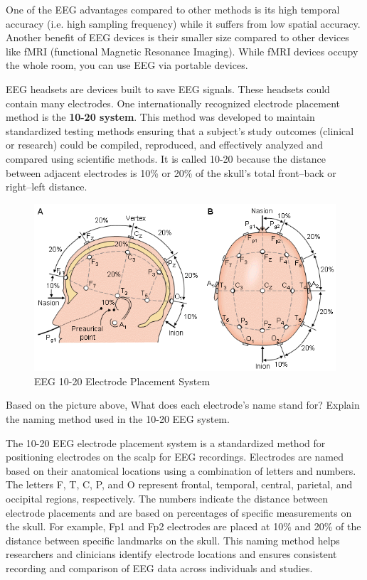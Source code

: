 \documentclass[12pt]{article}
\begin{document}
One of the EEG advantages compared to other methods is its high temporal accuracy (i.e. high sampling frequency) while it suffers from low spatial accuracy. Another benefit of EEG devices is their smaller size compared to other devices like fMRI (functional Magnetic Resonance Imaging). While fMRI devices occupy the whole room, you can use EEG via portable devices.\par

EEG headsets are devices built to save EEG signals. These headsets could contain many electrodes. One internationally recognized electrode placement method is the \textbf{10-20 system}. This method was developed to maintain standardized testing methods ensuring that a subject's study outcomes (clinical or research) could be compiled, reproduced, and effectively analyzed and compared using scientific methods. It is called 10-20 because the distance between adjacent electrodes is 10\% or 20\%  of the skull's total front–back or right–left distance.

\begin{figure}[h]
	\includegraphics[scale=0.5,width=1\textwidth, inner]{EEG-10-20-Electrode-Placement}
	\caption{EEG 10-20 Electrode Placement System}
	\label{fig:figure1}
\end{figure}

Based on the picture above, What does each electrode's name stand for? Explain the naming method used in the 10-20 EEG system.

\begin{qsolve}[]
    The 10-20 EEG electrode placement system is a standardized method for positioning electrodes on the scalp for EEG recordings. Electrodes are named based on their anatomical locations using a combination of letters and numbers. The letters F, T, C, P, and O represent frontal, temporal, central, parietal, and occipital regions, respectively. The numbers indicate the distance between electrode placements and are based on percentages of specific measurements on the skull. For example, Fp1 and Fp2 electrodes are placed at 10\% and 20\% of the distance between specific landmarks on the skull. This naming method helps researchers and clinicians identify electrode locations and ensures consistent recording and comparison of EEG data across individuals and studies.
\end{qsolve}
\end{document}
